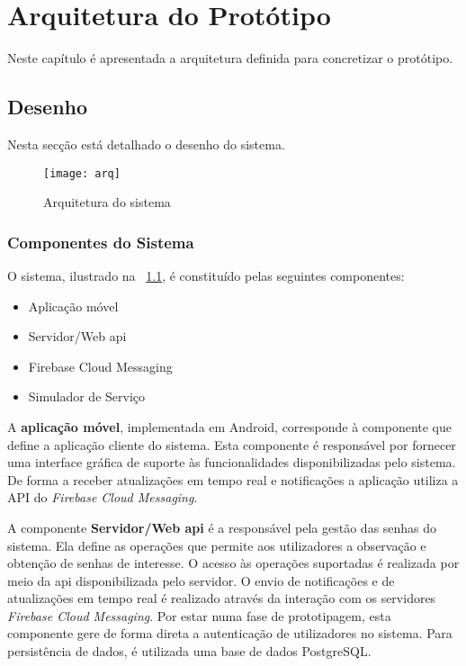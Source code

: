 
\chapter{Arquitetura do Protótipo}
\label{cha:arquitetura}

Neste capítulo é apresentada a arquitetura definida para concretizar o protótipo.

\section{Desenho} 
\label{sec:arquitetura}

Nesta secção está detalhado o desenho do sistema.

\begin{figure}[ht]
	\centering
	\texttt{[image: arq]}
	  \caption{Arquitetura do sistema}
  \label{fig:arq_s}
\end{figure}


\subsection{Componentes do Sistema} 
\label{sec:arquitetura}

O sistema, ilustrado na \figurename~\ref{fig:arq_s}, é constituído pelas seguintes componentes:
\begin{itemize}
\item Aplicação móvel
\item Servidor/Web \acrshort{api}
\item Firebase Cloud Messaging \cite{firebase}
\item Simulador de Serviço
\end{itemize}

A \textbf{aplicação móvel}, implementada em Android, corresponde à componente que define a aplicação cliente do sistema. Esta componente é responsável por fornecer uma interface gráfica de suporte às funcionalidades disponibilizadas pelo sistema. De forma a receber atualizações em tempo real e notificações a aplicação utiliza a API do \textit{Firebase Cloud Messaging}.

A componente \textbf{Servidor/Web \acrshort{api}} é a responsável pela gestão das senhas do sistema. Ela define as operações que permite aos utilizadores a observação e obtenção de senhas de interesse.
O acesso às operações suportadas é realizada por meio da \acrshort{api} disponibilizada pelo servidor. O envio de notificações e de atualizações em tempo real é realizado através da interação com os servidores \textit{Firebase Cloud Messaging}. Por estar numa fase de prototipagem, esta componente gere de forma direta a autenticação de utilizadores no sistema. Para persistência de dados, é utilizada uma base de dados PostgreSQL.

